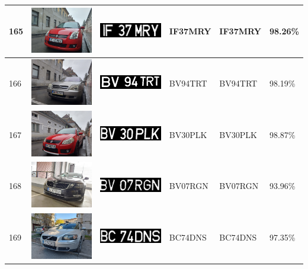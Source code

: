 \documentclass[a4paper,12pt]{report}
\begin{document}
\begin{longtable}{| m{0.6cm} | m{3cm} | m{3cm} | m{1.8cm} | m{1.8cm} | m{1.8cm} |}
        165 & \includegraphics[width=3cm,keepaspectratio]{dataset/102_d1.jpg} & \includegraphics[width=3cm,keepaspectratio]{segmentari/165.jpg} & IF37MRY & IF37MRY & 98.26\% \\ \hline
        166 & \includegraphics[width=3cm,keepaspectratio]{dataset/103_d1.jpg} & \includegraphics[width=3cm,keepaspectratio]{segmentari/166.jpg} & BV94TRT & BV94TRT & 98.19\% \\ \hline
        167 & \includegraphics[width=3cm,keepaspectratio]{dataset/104_d1.jpg} & \includegraphics[width=3cm,keepaspectratio]{segmentari/167.jpg} & BV30PLK & BV30PLK & 98.87\% \\ \hline
        168 & \includegraphics[width=3cm,keepaspectratio]{dataset/105_d1.jpg} & \includegraphics[width=3cm,keepaspectratio]{segmentari/168.jpg} & BV07RGN & BV07RGN & 93.96\% \\ \hline
        169 & \includegraphics[width=3cm,keepaspectratio]{dataset/106_d1.jpg} & \includegraphics[width=3cm,keepaspectratio]{segmentari/169.jpg} & BC74DNS & BC74DNS & 97.35\% \\ \hline

\end{longtable}
\end{document}
